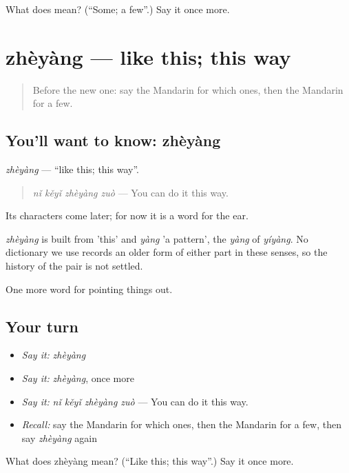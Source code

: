 \begin{tcolorbox}[breakable,colback=teal!4,colframe=teal!35!black,title={Before you move on}]
What does  mean? (\textquotedblleft{}Some; a few\textquotedblright{}.) Say it once more.
\end{tcolorbox}
\section[zhèyàng]{zhèyàng — like this; this way}

\label{lesson:ZH-C127-zheyang}



\begin{quote}
Before the new one: say the Mandarin for which ones, then the Mandarin for a few.
\end{quote}

\subsection*{You'll want to know: zhèyàng}
\emph{zhèyàng} — \textquotedblleft{}like this; this way\textquotedblright{}.

\begin{quote}
\emph{nǐ kěyǐ zhèyàng zuò} — You can do it this way.
\end{quote}

Its characters come later; for now it is a word for the ear.

\begin{cousinweb}
\emph{zhèyàng} is built from  'this' and \emph{yàng} 'a pattern', the \emph{yàng} of \emph{yíyàng}. No dictionary we use records an older form of either part in these senses, so the history of the pair is not settled.
\end{cousinweb}

\begin{grammarlens}[title={What you've built}]
One more word for pointing things out.
\end{grammarlens}

\subsection*{Your turn}
\begin{itemize}
\raggedright
  \item \emph{Say it:} \emph{zhèyàng}
  \item \emph{Say it:} \emph{zhèyàng}, once more
  \item \emph{Say it:} \emph{nǐ kěyǐ zhèyàng zuò} — You can do it this way.
  \item \emph{Recall:} say the Mandarin for which ones, then the Mandarin for a few, then say \emph{zhèyàng} again
\end{itemize}

\begin{tcolorbox}[breakable,colback=teal!4,colframe=teal!35!black,title={Before you move on}]
What does zhèyàng mean? (\textquotedblleft{}Like this; this way\textquotedblright{}.) Say it once more.
\end{tcolorbox}
